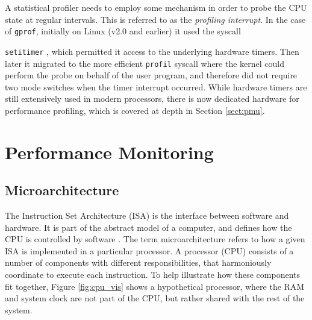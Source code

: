 A statistical profiler needs to employ some mechanism in order to probe the CPU state at regular intervals. This is referred to as the \textit{profiling interrupt}. In the case of \texttt{gprof}, initially on Linux (v2.0 and earlier) it used the syscall {\texttt{setitimer} \cite{DocsGProfImpl}, which permitted it access to the underlying hardware timers. Then later it migrated to the more efficient \texttt{profil} syscall where the kernel could perform the probe on behalf of the user program, and therefore did not require two mode switches when the timer interrupt occurred. While hardware timers are still extensively used in modern processors, there is now dedicated hardware for performance profiling, which is covered at depth in Section \ref{sect:pmu}.

\section{Performance Monitoring}

\subsection{Microarchitecture}

The Instruction Set Architecture (ISA) is the interface between software and hardware. It is part of the abstract model of a computer, and defines how the CPU is controlled by software \cite{GlossArmISA}. The term microarchitecture refers to how a given ISA is implemented in a particular processor. A processor (CPU) consists of a number of components with different responsibilities, that harmoniously coordinate to execute each instruction. To help illustrate how these components fit together, Figure \ref{fig:cpu_vis} shows a hypothetical processor, where the RAM and system clock are not part of the CPU, but rather shared with the rest of the system.

}
